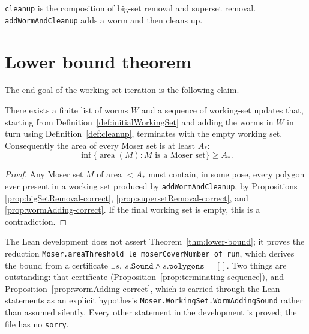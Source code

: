 \begin{definition}
  \label{def:cleanup}
  \leanok
  \texttt{cleanup} is the composition of big-set removal and superset
  removal. \texttt{addWormAndCleanup} adds a worm and then cleans up.
\end{definition}




\chapter{Lower bound theorem}

The end goal of the working set iteration is the following claim.

\begin{theorem}
  \label{thm:lower-bound}
  There exists a finite list of worms $W$ and a sequence of working-set
  updates that, starting from
  Definition~\ref{def:initialWorkingSet} and adding the worms in $W$ in
  turn using
  Definition~\ref{def:cleanup}, terminates with the empty working set.
  Consequently the area of every Moser set is at least $A_*$:
  \[
    \inf \{ \operatorname{area}(M) : M \text{ is a Moser set}\} \ge A_*.
  \]
\end{theorem}

\begin{proof}
  Any Moser set $M$ of area $<A_*$ must contain, in some pose, every
  polygon ever present in a working set produced by
  \texttt{addWormAndCleanup}, by Propositions
  \ref{prop:bigSetRemoval-correct},
  \ref{prop:supersetRemoval-correct}, and \ref{prop:wormAdding-correct}.
  If the final working set is empty, this is a contradiction.
\end{proof}

\begin{remark}
  \label{rem:lowerBoundLeanState}
  The Lean development does not assert Theorem~\ref{thm:lower-bound}; it proves
  the reduction \texttt{Moser.areaThreshold\_le\_moserCoverNumber\_of\_run},
  which derives the bound from a certificate
  $\exists s,\ s.\mathtt{Sound} \wedge s.\mathtt{polygons} = []$. Two things are
  outstanding: that certificate (Proposition~\ref{prop:terminating-sequence}),
  and Proposition~\ref{prop:wormAdding-correct}, which is carried through the
  Lean statements as an explicit hypothesis
  \texttt{Moser.WorkingSet.WormAddingSound} rather than assumed silently. Every
  other statement in the development is proved; the file has no \texttt{sorry}.
\end{remark}

